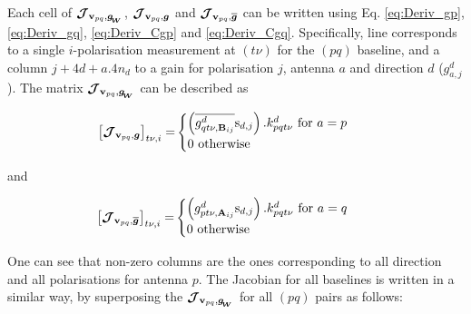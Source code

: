 





Each cell of
$\bm{\mathcal{J}}_{{\textbf{v}_{pq}},\bm{g_{\!_{W}}}}$, $\bm{\mathcal{J}}_{{\textbf{v}_{pq}},\bm{g}}$ and $\bm{\mathcal{J}}_{{\textbf{v}_{pq}},\bm{\overline{g}}}$ can be written using Eq. \ref{eq:Deriv_gp}, \ref{eq:Deriv_gq},
\ref{eq:Deriv_Cgp} and \ref{eq:Deriv_Cgq}. Specifically, line corresponds to a
single $i$-polarisation measurement at $(t\nu)$ for the $(pq)$ baseline, and a column
$j+4d+a.4n_d$ to a gain for polarisation $j$, antenna $a$ and
direction $d$ ($g^{d}_{a,j}$). The matrix $\bm{\mathcal{J}}_{{\textbf{v}_{pq}},\bm{g_{\!_{W}}}}$ can be described as




\begin{alignat}{2}
\label{eq:Jpq0}
\left[\bm{\mathcal{J}}_{{\textbf{v}_{pq}},\bm{g}}\right]_{t\nu,i}=&
\begin{cases}
\left(\overline{g^{d}_{qt\nu,\textbf{B}_{ij}}}\text{s}_{d,j}\right).k^{d}_{pqt\nu}\text{ for }a=p\\
0\ \text{otherwise}
\end{cases}
\end{alignat}

\noindent and

\begin{alignat}{2}
\label{eq:Jpq1}
\left[\bm{\mathcal{J}}_{{\textbf{v}_{pq}},\bm{\overline{g}}}\right]_{t\nu,i}=&
\begin{cases}
\left(g^{d}_{pt\nu,\textbf{A}_{ij}}\text{s}_{d,j}\right).k^{d}_{pqt\nu}\text{ for }a=q\\
0\ \text{otherwise}
\end{cases}
\end{alignat}

\noindent One can see that non-zero columns are the ones
corresponding to all direction and all polarisations for antenna $p$. The Jacobian for all
baselines is written in a similar way, by superposing the
$\bm{\mathcal{J}}_{{\textbf{v}_{pq}},\bm{g_{\!_{W}}}}$ for all $(pq)$ pairs as follows:

